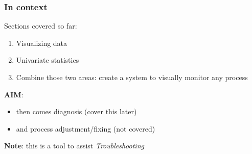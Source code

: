 % 
%  
%  






\begin{frame}\frametitle{In context}

	Sections covered so far:
	\begin{enumerate}
		\item	Visualizing data
		\item	Univariate statistics
		\item	Combine those two areas: create a system to visually monitor any process
	\end{enumerate}

	\vspace{24pt}
	\textbf{AIM}: {}
	\begin{itemize}
		\item	then comes diagnosis (cover this later)
		\item	and process adjustment/fixing (not covered)
	\end{itemize}
	
	\vspace{24pt}
	\textbf{Note}: this is a tool to assist \emph{Troubleshooting}
\end{frame}

